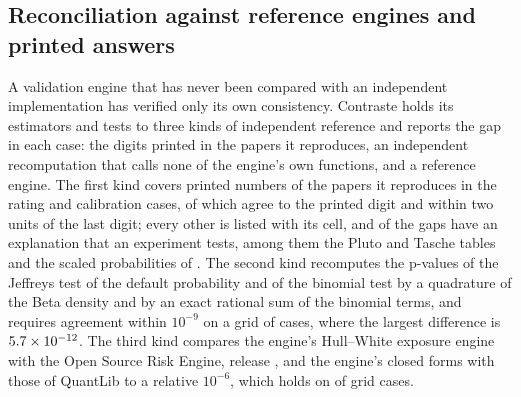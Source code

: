 \subsection{Reconciliation against reference engines and printed answers}
\label{sec:bs2}

A validation engine that has never been compared with an independent implementation has verified only its own consistency. Contraste
holds its estimators and tests to three kinds of independent reference and reports the gap in each case: the digits printed in the papers
it reproduces, an independent recomputation that calls none of the engine's own functions, and a reference engine. The first kind covers
\pxTwoPrinted{} printed numbers of the papers it reproduces in the rating and calibration cases, of which \pxTwoReproduced{} agree to the printed
digit and \pxPpTwoWithinTwo{} within two units of the last digit; every other is listed with its cell, and \pxPpTwoMissTested{} of the \pxPpTwoMissTotal{}
gaps have an explanation that an experiment tests, among them the Pluto and Tasche tables and the scaled
probabilities of \citet{ratings:tasche2013}. The second kind recomputes the p-values of the Jeffreys test of the default probability
\citep{proposed:jeffreys1946} and of the binomial test by a quadrature of the Beta density and by an exact rational sum of the binomial terms,
and requires agreement within $10^{-9}$ on a grid of \pxTwoGridCases{} cases, where the largest difference is $5.7\times10^{-12}$. The third kind compares the engine's Hull--White exposure
engine with the Open Source Risk Engine, release \pxTwoOreVersion{}, and the engine's closed forms with those of QuantLib to a relative $10^{-6}$, which holds on \pxPpTwoClosedWithin{} of \pxPpTwoClosedCases{} grid cases.

